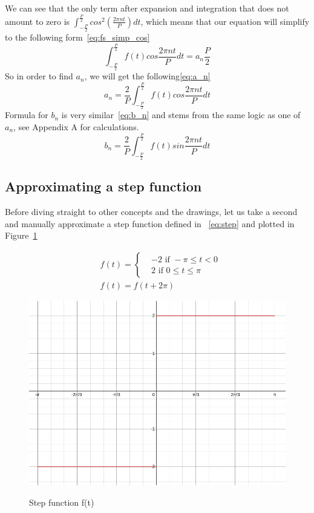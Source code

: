 \documentclass{article}
\begin{document}
    We can see that the only term after expansion and integration that does not 
    amount to zero is $\int_{-\frac{P}{2}}^{\frac{P}{2}}cos^2(\frac{2\pi nt}{P})dt$,
    which means that our equation will simplify to the following form~\eqref{eq:fs_simp_cos}
    \begin{equation}\label{eq:fs_simp_cos}
        \int_{-\frac{P}{2}}^{\frac{P}{2}}f(t)cos\frac{2\pi nt}{P}dt = a_n\frac{P}{2}
    \end{equation}
    So in order to find $a_n$, we will get the following\eqref{eq:a_n}
    \begin{equation}\label{eq:a_n}
        a_n = \frac{2}{P}\int_{-\frac{P}{2}}^{\frac{P}{2}}f(t)cos\frac{2\pi nt}{P}dt
    \end{equation}
    Formula for $b_n$ is very similar~\eqref{eq:b_n} and stems from the same logic as one of 
    $a_n$, see Appendix A for calculations.
    \begin{equation}\label{eq:b_n}
        b_n = \frac{2}{P}\int_{-\frac{P}{2}}^{\frac{P}{2}}f(t)sin\frac{2\pi nt}{P}dt
    \end{equation}

\subsection{Approximating a step function}
    
    Before diving straight to other concepts and the drawings, let us 
    take a second and manually approximate a step function defined in ~\eqref{eq:step}
    and plotted in Figure~\ref{fig:step_func}

    \begin{equation}\label{eq:step}
    \begin{split}
         &f(t) = 
        \begin{cases} 
            & -2 \text{ if } -\pi \leq t < 0 \\
            & 2 \text{ if }  0 \leq t \leq \pi
        \end{cases} \\
        & f(t) = f(t + 2\pi) 
    \end{split}
    \end{equation}

    \begin{figure}[H]
        \caption{Step function f(t)}
        \centering
        \includegraphics[width=0.5\linewidth]{step_func}
        \label{fig:step_func}
    \end{figure} 
\end{document}
